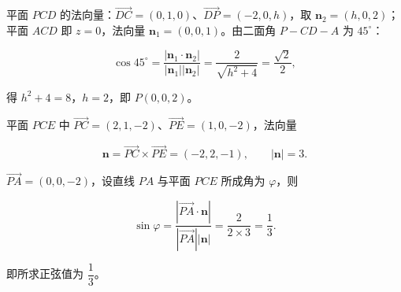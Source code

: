 \begin{answer}
平面 \(PCD\) 的法向量：\(\overrightarrow{DC}=(0,1,0)\)、\(\overrightarrow{DP}=(-2,0,h)\)，取 \(\boldsymbol n_2=(h,0,2)\)；平面 \(ACD\) 即 \(z=0\)，法向量 \(\boldsymbol n_1=(0,0,1)\)。由二面角 \(P-CD-A\) 为 \(45^{\circ}\)：

\nopagebreak[4]
\[
\cos45^{\circ}=\frac{|\boldsymbol n_1\cdot\boldsymbol n_2|}{|\boldsymbol n_1||\boldsymbol n_2|}=\frac{2}{\sqrt{h^{2}+4}}=\frac{\sqrt{2}}{2},
\]

得 \(h^{2}+4=8\)，\(h=2\)，即 \(P(0,0,2)\)。

平面 \(PCE\) 中 \(\overrightarrow{PC}=(2,1,-2)\)、\(\overrightarrow{PE}=(1,0,-2)\)，法向量

\nopagebreak[4]
\[
\boldsymbol n=\overrightarrow{PC}\times\overrightarrow{PE}=(-2,2,-1),\qquad|\boldsymbol n|=3.
\]

\(\overrightarrow{PA}=(0,0,-2)\)，设直线 \(PA\) 与平面 \(PCE\) 所成角为 \(\varphi\)，则

\nopagebreak[4]
\[
\sin\varphi=\frac{|\overrightarrow{PA}\cdot\boldsymbol n|}{|\overrightarrow{PA}||\boldsymbol n|}=\frac{2}{2\times3}=\frac{1}{3}.
\]

即所求正弦值为 \(\dfrac{1}{3}\)。



\end{answer}
